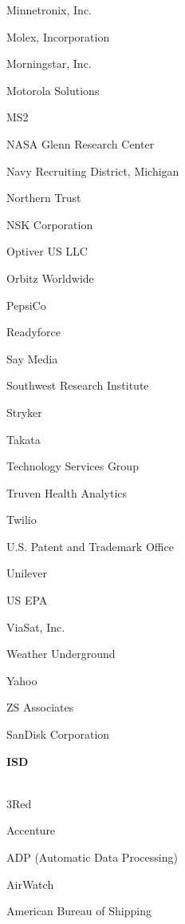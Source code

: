 \documentclass[twoside]{article}
\begin{document}
\begin{center}
\begin{multicols}{5}
\begin{FlushLeft}
\begin{compactitem}
\item Minnetronix, Inc.
\item Molex, Incorporation
\item Morningstar, Inc.
\item Motorola Solutions
\item MS2
\item NASA Glenn Research Center
\item Navy Recruiting District, Michigan
\item Northern Trust
\item NSK Corporation
\item Optiver US LLC
\item Orbitz Worldwide
\item PepsiCo
\item Readyforce
\item Say Media
\item Southwest Research Institute
\item Stryker
\item Takata
\item Technology Services Group
\item Truven Health Analytics
\item Twilio
\item U.S. Patent and Trademark Office
\item Unilever
\item US EPA
\item ViaSat, Inc.
\item Weather Underground
\item Yahoo
\item ZS Associates
\item SanDisk Corporation
\end{compactitem}
        \end{FlushLeft}
        \vspace{1em}
        {\fontsize{14}{16}\selectfont \bf ISD}\\
        \vspace{-1em}
        ~\hrulefill~
        \vspace{-.9em}
        \begin{FlushLeft}
        \begin{compactitem}
        \item 3Red
\item Accenture
\item ADP (Automatic Data Processing)
\item AirWatch
\item American Bureau of Shipping

\end{compactitem}
\end{FlushLeft}
\end{multicols}
\end{center}
\end{document}
